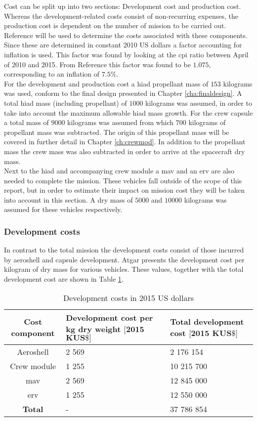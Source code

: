 Cost can be split up into two sections: Development cost and production cost. Whereas the development-related costs consist of non-recurring expenses, the production cost is dependent on the number of mission to be carried out. Reference \cite{Wertz2011} will be used to determine the costs associated with these components. Since these are determined in constant 2010 US dollars a factor accounting for inflation is used. This factor was found by looking at the \gls{cpi} ratio between April of 2010 and 2015. From Reference \cite{Crawford2015} this factor was found to be $1.075$, corresponding to an inflation of $7.5\%$.\\
For the development and production cost a \gls{hiad} propellant mass of $153$ kilograms was used, conform to the final design presented in Chapter \ref{cha:finaldesign}. A total \gls{hiad} mass (including propellant) of $1000$ kilograms was assumed, in order to take into account the maximum allowable \gls{hiad} mass growth. For the crew capsule a total mass of $9000$ kilograms was assumed from which $700$ kilograms of propellant mass was subtracted. The origin of this propellant mass will be covered in further detail in Chapter \ref{ch:crewmod}. In addition to the propellant mass the crew mass was also subtracted in order to arrive at the spacecraft dry mass.\\
Next to the \gls{hiad} and accompanying crew module a \gls{mav} and an \gls{erv} are also needed to complete the mission. These vehicles fall outside of the scope of this report, but in order to estimate their impact on mission cost they will be taken into account in this section. A dry mass of $5000$ and $10 000$ kilograms was assumed for these vehicles respectively.

\subsubsection{Development costs}
In contrast to the total mission the development costs consist of those incurred by aeroshell and capsule development. Atgar \cite[p.296]{Wertz2011} presents the development cost per kilogram of dry mass for various vehicles. These values, together with the total development cost are shown in Table \ref{tab:devcosts}.

\begin{table}
	\centering
	\caption{Development costs in 2015 US dollars}
	\begin{tabular}{|c|p{5cm}|p{5cm}|}
		\hline
		\textbf{Cost component} & \textbf{Development cost per kg dry weight $\mathbf{[2015}$ $\mathbf{K US\$]}$} & \textbf{Total development cost $\mathbf{[2015}$ $\mathbf{K US\$]}$} \\ \hline \hline
		Aeroshell & 2 569 & 2 176 154 \\
		Crew module & 1 255 & 10 215 700 \\
		\acrlong{mav} & 2 569 & 12 845 000 \\
		\acrlong{erv} & 1 255 & 12 550 000 \\ \hline
		\textbf{Total} & - & 37 786 854 \\
		\hline
	\end{tabular}
	\label{tab:devcosts}
\end{table}

